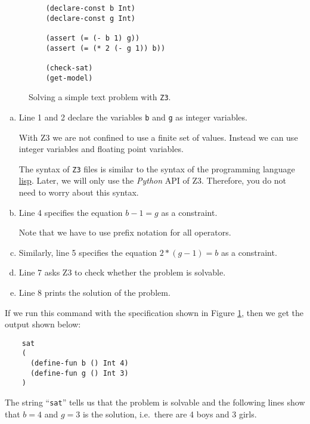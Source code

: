 \begin{figure}[!ht]
\centering
\begin{verbatim}
    (declare-const b Int)
    (declare-const g Int)
    
    (assert (= (- b 1) g))
    (assert (= (* 2 (- g 1)) b))
    
    (check-sat)
    (get-model)
\end{verbatim}
\vspace*{-0.3cm}
\caption{Solving a simple text problem with \texttt{Z3}.}
\label{fig:Brothers-and-Sisters.z3}
\end{figure}
\begin{enumerate}[(a)]
\item Line 1 and 2 declare the variables \texttt{b} and \texttt{g} as integer variables.

      With Z3 we are not confined to use a finite set of values.  Instead we can use integer variables and
      floating point variables.

      The syntax of \texttt{Z3} files is similar to the syntax of the programming language
      \href{https://en.wikipedia.org/wiki/Lisp_(programming_language)}{lisp}.  Later, we will only use the
      \textsl{Python} API of Z3.  Therefore, you do not need to worry about this syntax. 
\item Line 4 specifies the equation $b - 1 = g$ as a constraint.

      Note that we have to use prefix notation for all operators.
      
\item Similarly, line 5 specifies the equation $2 * (g - 1) = b$ as a constraint.
\item Line 7 asks Z3 to check whether the problem is solvable.
\item Line 8 prints the solution of the problem.
\end{enumerate}
If we run this command with the specification shown in Figure \ref{fig:Brothers-and-Sisters.z3}, then we get
the output shown below:

\begin{verbatim}
    sat
    (
      (define-fun b () Int 4)
      (define-fun g () Int 3)
    )
\end{verbatim}
The string ``\texttt{sat}'' tells us that the problem is solvable and the following lines show that
$b = 4$ and $g = 3$ is the solution, i.e.~there are 4 boys and 3 girls.

